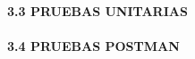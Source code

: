 \begin{flushleft}
\begin{center}
	\end{center}
\textbf{}\\
\textbf{}\\
\textbf{}\\
\textbf{}\\
\textbf{}\\
\textbf{}\\
\textbf{}\\
\textbf{}\\
\textbf{}\\
\textbf{}\\
\textbf{}\\
\textbf{}\\
\textbf{}\\
\textbf{}\\
\textbf{}\\
\textbf{}\\
\textbf {3.3 PRUEBAS UNITARIAS}\\
\textbf{}\\












\textbf {3.4 PRUEBAS POSTMAN }\\
\textbf{}\\


\end{flushleft}
